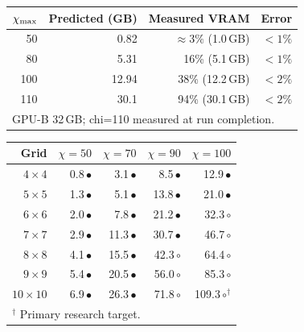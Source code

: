 \begin{figure}[ht]
\centering
{}
\label{tab:vram}
\smallskip
\begin{tabular}{rrrr}
\toprule
$\chi_{\mathrm{max}}$ & Predicted (GB) & Measured VRAM & Error \\
\midrule
 50 & 0.82 & $\approx 3\%$ (1.0\,GB) & $< 1\%$ \\
 80 & 5.31 & 16\% (5.1\,GB) & $< 1\%$ \\
100 & 12.94 & 38\% (12.2\,GB) & $< 2\%$ \\
110 & 30.1 & 94\% (30.1\,GB) & $< 2\%$ \\
\midrule
\multicolumn{4}{l}{GPU-B 32\,GB; chi=110 measured at run completion.} \\
\bottomrule
\end{tabular}
\bigskip
{}
\label{tab:vram_grid}
\smallskip
\begin{tabular}{r rrrr}
\toprule
Grid & $\chi=50$ & $\chi=70$ & $\chi=90$ & $\chi=100$ \\
\midrule
$4\times4$ & 0.8\,$\bullet$ & 3.1\,$\bullet$ & 8.5\,$\bullet$ & 12.9\,$\bullet$ \\
$5\times5$ & 1.3\,$\bullet$ & 5.1\,$\bullet$ & 13.8\,$\bullet$ & 21.0\,$\bullet$ \\
$6\times6$ & 2.0\,$\bullet$ & 7.8\,$\bullet$ & 21.2\,$\bullet$ & 32.3\,$\circ$ \\
$7\times7$ & 2.9\,$\bullet$ & 11.3\,$\bullet$ & 30.7\,$\bullet$ & 46.7\,$\circ$ \\
$8\times8$ & 4.1\,$\bullet$ & 15.5\,$\bullet$ & 42.3\,$\circ$ & 64.4\,$\circ$ \\
$9\times9$ & 5.4\,$\bullet$ & 20.5\,$\bullet$ & 56.0\,$\circ$ & 85.3\,$\circ$ \\
$10\times10$ & 6.9\,$\bullet$ & 26.3\,$\bullet$ & 71.8\,$\circ$ & 109.3\,$\circ$$^\dagger$ \\
\midrule
\multicolumn{5}{l}{$^\dagger$ Primary research target.} \\
\bottomrule
\end{tabular}
\end{figure}
